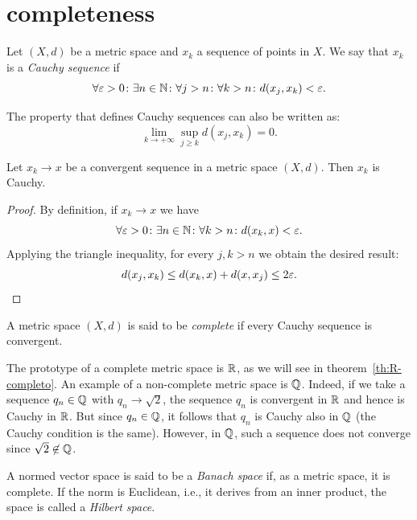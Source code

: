 \section{completeness}

\begin{definition}
\mymark{***}
Let $(X,d)$ be a metric space and $x_k$ a sequence of points in $X$.
We say that $x_k$ is a
\emph{Cauchy sequence}
if
\[
 \forall \varepsilon>0\colon \exists n\in {\mathbb N}\colon \forall j>n \colon \forall k > n \colon d(x_j,x_k) < \varepsilon.
\]
\end{definition}

The property that defines Cauchy sequences
can also be written as:
\[
  \lim_{k \to +\infty} \sup_{j\ge k} d(x_j, x_k) = 0.
\]

\begin{theorem}
\mymark{**}%
\label{th:se_converge_cauchy}
Let $x_k\to x$ be a convergent sequence in a metric space $(X,d)$. Then $x_k$ is
Cauchy.
\end{theorem}
%
\begin{proof}
\mymark{**}
By definition, if $x_k \to x$ we have
\[
  \forall \varepsilon>0\colon \exists n\in {\mathbb N} \colon
  \forall k>n \colon d(x_k,x)< \varepsilon.
\]
Applying the triangle inequality, for every $j,k>n$
we obtain the desired result:
\[
  d(x_j, x_k) \le d(x_k,x) + d(x,x_j) \le 2\varepsilon.
\]
\end{proof}

\begin{definition}[completeness]
\mymark{***}
A metric space $(X,d)$ is said to be \emph{complete}%
if every Cauchy sequence is convergent.
\end{definition}

The prototype of a complete metric space is ${\mathbb R}$, as we will see in
theorem~\ref{th:R-completo}.
An example of a non-complete metric space is ${\mathbb Q}$.
Indeed, if we take a
sequence $q_n \in{\mathbb Q}$ with $q_n\to \sqrt 2$, the sequence $q_n$ is convergent
in ${\mathbb R}$ and hence is Cauchy in ${\mathbb R}$. But since $q_n\in {\mathbb Q}$, it follows
that $q_n$ is Cauchy also in ${\mathbb Q}$ (the Cauchy condition is the same).
However, in ${\mathbb Q}$, such a sequence does not converge since $\sqrt 2\not \in
{\mathbb Q}$.

\begin{definition}
A normed vector space is said to be a
\emph{Banach space}%
%
%
if, as a metric space, it is complete.
If the norm is Euclidean, i.e., it derives from an inner product, the space is
called
a \emph{Hilbert space}.
%
\end{definition}

